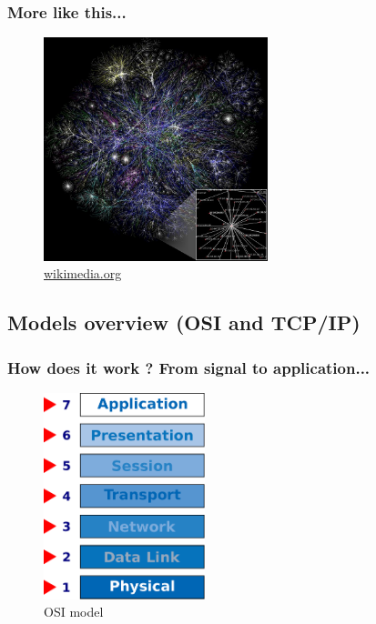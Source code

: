     \begin{frame}
    \frametitle{More like this...}
      \begin{figure}
    \includegraphics[height=6.5cm]{./imgs/map.jpg}
  \caption{\color{blue}\href{https://upload.wikimedia.org/wikipedia/commons/thumb/d/d2/Internet_map_1024.jpg/768px-Internet_map_1024.jpg}{wikimedia.org}}
  \label{fig:map}
      \end{figure}
  \end{frame}

\subsection{Models overview (OSI and TCP/IP)}
  \begin{frame}
    \frametitle{How does it work ? From signal to application...}
    \begin{figure}[t]
      \centering
      \includegraphics[height=6cm]{./imgs/osi_model.eps}
      \caption{OSI model}
      \label{fig:layers}
    \end{figure}
  \end{frame}